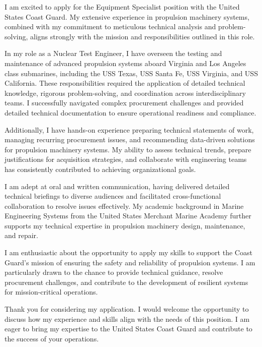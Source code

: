 I am excited to apply for the Equipment Specialist position with the United States Coast Guard.
My extensive experience in propulsion machinery systems, combined with my commitment to meticulous technical analysis and problem-solving, aligns strongly with the mission and responsibilities outlined in this role.

In my role as a Nuclear Test Engineer, I have overseen the testing and maintenance of advanced propulsion systems aboard Virginia and Los Angeles class submarines, including the USS Texas, USS Santa Fe, USS Virginia, and USS California.
These responsibilities required the application of detailed technical knowledge, rigorous problem-solving, and coordination across interdisciplinary teams.
I successfully navigated complex procurement challenges and provided detailed technical documentation to ensure operational readiness and compliance.

Additionally, I have hands-on experience preparing technical statements of work, managing recurring procurement issues, and recommending data-driven solutions for propulsion machinery systems.
My ability to assess technical trends, prepare justifications for acquisition strategies, and collaborate with engineering teams has consistently contributed to achieving organizational goals.

I am adept at oral and written communication, having delivered detailed technical briefings to diverse audiences and facilitated cross-functional collaboration to resolve issues effectively.
My academic background in Marine Engineering Systems from the United States Merchant Marine Academy further supports my technical expertise in propulsion machinery design, maintenance, and repair.

I am enthusiastic about the opportunity to apply my skills to support the Coast Guard’s mission of ensuring the safety and reliability of propulsion systems.
I am particularly drawn to the chance to provide technical guidance, resolve procurement challenges, and contribute to the development of resilient systems for mission-critical operations.

Thank you for considering my application.
I would welcome the opportunity to discuss how my experience and skills align with the needs of this position.
I am eager to bring my expertise to the United States Coast Guard and contribute to the success of your operations.

